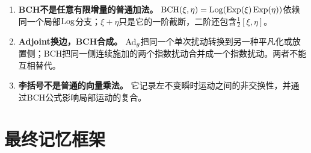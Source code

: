 \begin{enumerate}
    \item \textbf{BCH不是任意有限增量的普通加法。}
    $\operatorname{BCH}(\xi,\eta)=\operatorname{Log}(\operatorname{Exp}(\xi)\operatorname{Exp}(\eta))$依赖同一个局部$\operatorname{Log}$分支；$\xi+\eta$只是它的一阶截断，二阶还包含$\frac12[\xi,\eta]$。

    \item \textbf{Adjoint换边，BCH合成。}
    $\operatorname{Ad}_g$把同一个单次扰动转换到另一种平凡化或放置侧；BCH把同一侧连续施加的两个指数扰动合并成一个指数扰动。两者不能互相替代。

    \item \textbf{李括号不是普通的向量乘法。} 它记录左不变瞬时运动之间的非交换性，并通过BCH公式影响局部运动的复合。
\end{enumerate}


\section{最终记忆框架}

